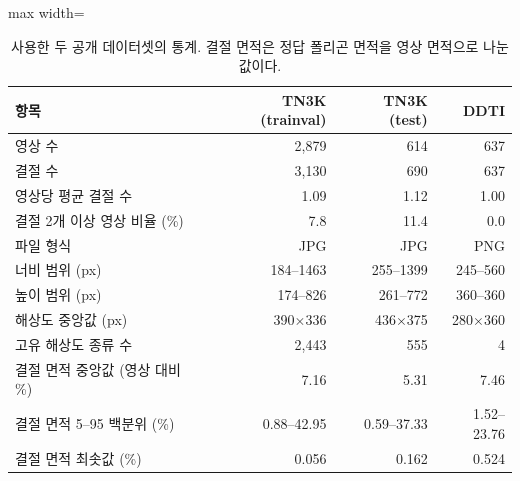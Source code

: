 \begin{table}[htbp]
\centering
\small
\caption[사용한 두 공개 데이터셋의 통계.]{사용한 두 공개 데이터셋의 통계. 결절 면적은 정답 폴리곤 면적을 영상 면적으로 나눈 값이다.}
\label{tab:dataset_stats}
\begin{adjustbox}{max width=\linewidth}
\begin{tabular}{lrrr}
\toprule
항목 & TN3K (trainval) & TN3K (test) & DDTI \\
\midrule
영상 수 & 2,879 & 614 & 637 \\
결절 수 & 3,130 & 690 & 637 \\
영상당 평균 결절 수 & 1.09 & 1.12 & 1.00 \\
결절 2개 이상 영상 비율 (\%) & 7.8 & 11.4 & 0.0 \\
파일 형식 & JPG & JPG & PNG \\
너비 범위 (px) & 184--1463 & 255--1399 & 245--560 \\
높이 범위 (px) & 174--826 & 261--772 & 360--360 \\
해상도 중앙값 (px) & 390$\times$336 & 436$\times$375 & 280$\times$360 \\
고유 해상도 종류 수 & 2,443 & 555 & 4 \\
결절 면적 중앙값 (영상 대비 \%) & 7.16 & 5.31 & 7.46 \\
결절 면적 5--95 백분위 (\%) & 0.88--42.95 & 0.59--37.33 & 1.52--23.76 \\
결절 면적 최솟값 (\%) & 0.056 & 0.162 & 0.524 \\
\bottomrule
\end{tabular}
\end{adjustbox}
\end{table}
